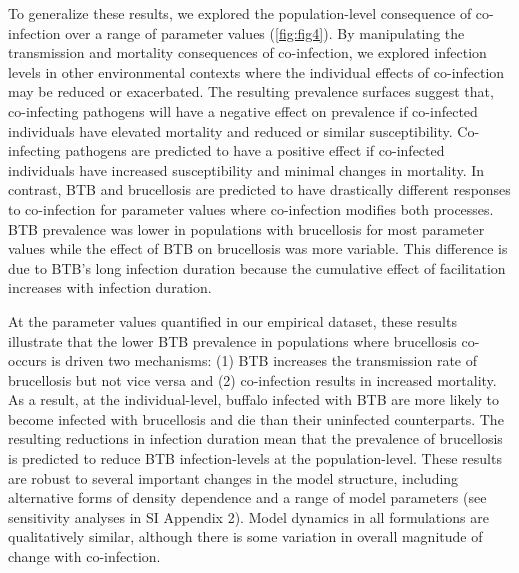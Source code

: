 \documentclass[10pt,letterpaper]{article}
\begin{document}
To generalize these results, we explored the population-level consequence of co-infection over a range of parameter values (\ref{fig:fig4}). By manipulating the transmission and mortality consequences of co-infection, we explored infection levels in other environmental contexts where the individual effects of co-infection may be reduced or exacerbated. The resulting prevalence surfaces suggest that, co-infecting pathogens will have a negative effect on prevalence if co-infected individuals have elevated mortality and reduced or similar susceptibility. Co-infecting pathogens are predicted to have a positive effect if co-infected individuals have increased susceptibility and minimal changes in mortality. In contrast, BTB and brucellosis are predicted to have drastically different responses to co-infection for parameter values where co-infection modifies both processes. BTB prevalence was lower in populations with brucellosis for most parameter values while the effect of BTB on brucellosis was more variable. This difference is due to BTB’s long infection duration because the cumulative effect of facilitation increases with infection duration.

At the parameter values quantified in our empirical dataset, these results illustrate that the lower BTB prevalence in populations where brucellosis co-occurs is driven two mechanisms: (1) BTB increases the transmission rate of brucellosis but not vice versa and (2) co-infection results in increased mortality. As a result, at the individual-level, buffalo infected with BTB are more likely to become infected with brucellosis and die than their uninfected counterparts. The resulting reductions in infection duration mean that the prevalence of brucellosis is predicted to reduce BTB infection-levels at the population-level. These results are robust to several important changes in the model structure, including alternative forms of density dependence and a range of model parameters (see sensitivity analyses in SI Appendix 2).  Model dynamics in all formulations are qualitatively similar, although there is some variation in overall magnitude of change with co-infection.
\end{document}
